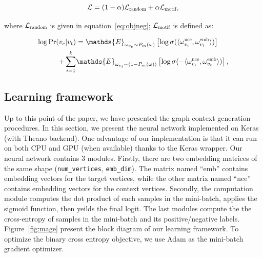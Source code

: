 \documentclass[letterpaper]{article}
\begin{document}

            \begin{equation}
                \label{eq:mageobj}
                \mathcal{L} = (1-\alpha) \mathcal{L}_{\scalebox{0.7}{random}} + 
                                \alpha \mathcal{L}_{\scalebox{0.7}{motif}} ,
            \end{equation}

            \noindent
            where $\mathcal{L}_{\scalebox{0.7}{random}}$ is given in equation~\ref{eq:objneg};
            $\mathcal{L}_{\scalebox{0.7}{motif}}$ is defined as:

            \begin{equation}
                \label{eq:objmotif}
                \begin{aligned}
                    \log \mbox{Pr} (v_c | v_t) & = \mathds{E}_{\omega_{v_c} \sim P_m(\omega)} \left[ \log \sigma( \langle \omega^{\scalebox{0.7}{nce}}_{v_c} , \omega^{\scalebox{0.7}{emb}}_{v_t} \rangle ) \right] \\
                + \sum_{i=1}^{k} & \mathds{E}_{\omega_{v_i} \sim (1-P_m(\omega))} \left[ \log \sigma( -\langle \omega^{\scalebox{0.7}{nce}}_{v_i} , \omega^{\scalebox{0.7}{emb}}_{v_t} \rangle) \right],
                \end{aligned}
            \end{equation}

        \subsection{Learning framework}
            
            Up to this point of the paper, we have presented the graph context generation procedures.
            In this section, we present the neural network implemented on Keras \cite{keras} 
            (with Theano \cite{theano} backend). One advantage of our implementation is that
            it can run on both CPU and GPU (when available) thanks to the Keras wrapper. Our
            neural network contains 3 modules. Firstly, there are two embedding matrices of 
            the same shape (\texttt{num\_vertices}, \texttt{emb\_dim}). The matrix named ``emb''
            contains embedding vectors for the target vertices, while the other matrix named
            ``nce'' contains embedding vectors for the context vertices. Secondly, the computation
            module computes the dot product of each samples in the mini-batch, applies the
            sigmoid function, then yeilds the final logit. The last modules compute the
            the cross-entropy \cite{xentropy} of samples in the mini-batch and its positive/negative
            labels. Figure~\ref{fig:mage} present the block diagram of our learning framework.
            To optimize the binary cross entropy objective, we use Adam \cite{adam} as the 
            mini-batch gradient optimizer.
            
\end{document}
